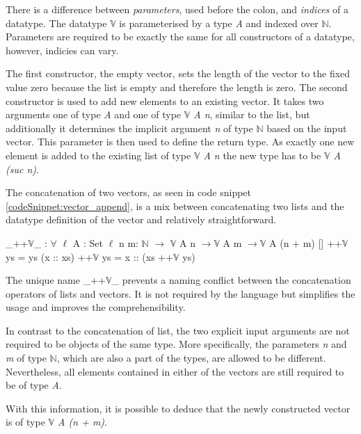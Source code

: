 There is a difference between \emph{parameters}, used before the colon, and \emph{indices} of a datatype.
The datatype $\mathbb{V}$ is parameterised by a type \emph{A} and indexed over $\mathbb{N}$\cite{norell:deptyped}.
Parameters are required to be exactly the same for all constructors of a datatype, however, indicies can vary.

The first constructor, the empty vector, sets the length of the vector to the fixed value zero because the list is empty and therefore the length is zero.
The second constructor is used to add new elements to an existing vector. It takes two arguments one of type \emph{A} and one of type \emph{$\mathbb{V}$ A n}, similar to the list, but additionally it determines the implicit argument \emph{n} of type $\mathbb{N}$ based on the input vector.
This parameter is then used to define the return type. As exactly one new element is added to the existing list of type \emph{$\mathbb{V}$ A n} the new type has to be \emph{$\mathbb{V}$ A (suc n)}.

The concatenation of two vectors, as seen in code snippet \ref{codeSnippet:vector_append}, is a mix between concatenating two lists and the datatype definition of the vector and relatively straightforward.

\begin{codesnippet}[mathescape=true, caption={Definition of the vector concatenation function in Agda}, label={codeSnippet:vector_append}]
_++$\mathbb{V}$_ : $\forall$ {$\ell$} {A : Set $\ell$}  {n m: $\mathbb{N}$} $\rightarrow$
        $\mathbb{V}$ A n $\rightarrow \mathbb{V}$ A m $\rightarrow \mathbb{V}$ A (n + m)
  []        ++$\mathbb{V}$ ys = ys
  (x :: xs) ++$\mathbb{V}$ ys = x :: (xs ++$\mathbb{V}$ ys)
\end{codesnippet}
The unique name \_++$\mathbb{V}$\_ prevents a naming conflict between the concatenation operators of lists and vectors.
It is not required by the language but simplifies the usage and improves the comprehensibility.

In contrast to the concatenation of list, the two explicit input arguments are not required to be objects of the same type.
More specifically, the parameters \emph{n} and \emph{m} of type $\mathbb{N}$, which are also a part of the types, are allowed to be different. 
Nevertheless, all elements contained in either of the vectors are still required to be of type \emph{A}.

With this information, it is possible to deduce that the newly constructed vector is of type \emph{$\mathbb{V}$ A (n + m)}.

